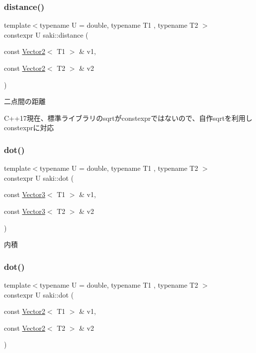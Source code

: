 \subsubsection{\texorpdfstring{distance()}{distance()}\hspace{0.1cm}{\footnotesize\ttfamily [2/2]}}
{\footnotesize\ttfamily template$<$typename U  = double, typename T1 , typename T2 $>$ \\
constexpr U saki\+::distance (\begin{DoxyParamCaption}\item[{const \mbox{\hyperlink{classsaki_1_1_vector2}{Vector2}}$<$ T1 $>$ \&}]{v1,  }\item[{const \mbox{\hyperlink{classsaki_1_1_vector2}{Vector2}}$<$ T2 $>$ \&}]{v2 }\end{DoxyParamCaption})}



二点間の距離 

C++17現在、標準ライブラリのsqrtがconstexprではないので、自作sqrtを利用しconstexprに対応 \mbox{\label{namespacesaki_a4f2643c9bd618538a43cdad4a71398af}} 
\subsubsection{\texorpdfstring{dot()}{dot()}\hspace{0.1cm}{\footnotesize\ttfamily [1/2]}}
{\footnotesize\ttfamily template$<$typename U  = double, typename T1 , typename T2 $>$ \\
constexpr U saki\+::dot (\begin{DoxyParamCaption}\item[{const \mbox{\hyperlink{classsaki_1_1_vector3}{Vector3}}$<$ T1 $>$ \&}]{v1,  }\item[{const \mbox{\hyperlink{classsaki_1_1_vector3}{Vector3}}$<$ T2 $>$ \&}]{v2 }\end{DoxyParamCaption})}



内積 

\mbox{\label{namespacesaki_a724d6c36d761314950d3ec8be6a4f4ab}} 
\subsubsection{\texorpdfstring{dot()}{dot()}\hspace{0.1cm}{\footnotesize\ttfamily [2/2]}}
{\footnotesize\ttfamily template$<$typename U  = double, typename T1 , typename T2 $>$ \\
constexpr U saki\+::dot (\begin{DoxyParamCaption}\item[{const \mbox{\hyperlink{classsaki_1_1_vector2}{Vector2}}$<$ T1 $>$ \&}]{v1,  }\item[{const \mbox{\hyperlink{classsaki_1_1_vector2}{Vector2}}$<$ T2 $>$ \&}]{v2 }\end{DoxyParamCaption})}



